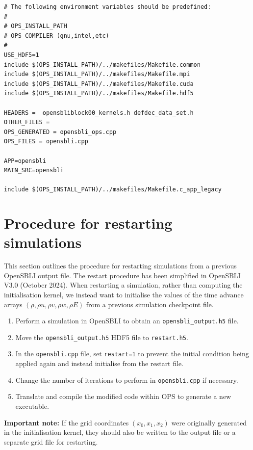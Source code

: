 \documentclass[11pt]{article}
\begin{document}
\begin{verbatim}
# The following environment variables should be predefined:
#
# OPS_INSTALL_PATH
# OPS_COMPILER (gnu,intel,etc)
#
USE_HDF5=1
include $(OPS_INSTALL_PATH)/../makefiles/Makefile.common
include $(OPS_INSTALL_PATH)/../makefiles/Makefile.mpi
include $(OPS_INSTALL_PATH)/../makefiles/Makefile.cuda
include $(OPS_INSTALL_PATH)/../makefiles/Makefile.hdf5

HEADERS =  opensbliblock00_kernels.h defdec_data_set.h
OTHER_FILES = 
OPS_GENERATED = opensbli_ops.cpp 
OPS_FILES = opensbli.cpp 

APP=opensbli
MAIN_SRC=opensbli

include $(OPS_INSTALL_PATH)/../makefiles/Makefile.c_app_legacy
\end{verbatim}


\newpage
\section{Procedure for restarting simulations}\label{sec:restarting}
This section outlines the procedure for restarting simulations from a previous OpenSBLI output file. The restart procedure has been simplified in OpenSBLI V3.0 (October 2024). When restarting a simulation, rather than computing the initialisation kernel, we instead want to initialise the values of the time advance arrays $\left(\rho, \rho u, \rho v, \rho w, \rho E\right)$ from a previous simulation checkpoint file.

\begin{enumerate}
\item{Perform a simulation in OpenSBLI to obtain an \verb|opensbli_output.h5| file.}
\item{Move the \verb|opensbli_output.h5| HDF5 file to \verb|restart.h5|.}
\item{In the \verb|opensbli.cpp| file, set \verb|restart=1| to prevent the initial condition being applied again and instead initialise from the restart file.}
\item{Change the number of iterations to perform in \verb|opensbli.cpp| if necessary.}
\item{Translate and compile the modified code within OPS to generate a new executable.}
\end{enumerate}

\noindent\textbf{Important note:} If the grid coordinates $\left(x_0, x_1, x_2\right)$ were originally generated in the initialisation kernel, they should also be written to the output file or a separate grid file for restarting.
\end{document}
